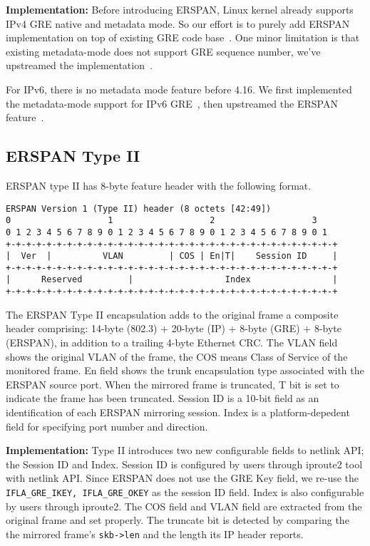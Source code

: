 \documentclass[10pt]{sigplanconf}
\begin{document}
\textbf{Implementation: }
Before introducing ERSPAN, Linux kernel already supports IPv4 GRE native
and metadata mode.  So our effort is to purely add ERSPAN implementation
on top of existing GRE code base~\cite{erspantype2}.
One minor limitation is that existing metadata-mode does not support
GRE sequence number, we've upstreamed the implementation~\cite{greseq}.

For IPv6, there is no metadata mode feature before 4.16.
We first implemented the metadata-mode support for IPv6 GRE~\cite{ip6md},
then upstreamed the ERSPAN feature~\cite{ip6erspanmd, ip6erspan}.


\subsection{ERSPAN Type II}
ERSPAN type II has 8-byte feature header with the following format.
{\scriptsize
\begin{verbatim}
ERSPAN Version 1 (Type II) header (8 octets [42:49])
0                   1                   2                   3
0 1 2 3 4 5 6 7 8 9 0 1 2 3 4 5 6 7 8 9 0 1 2 3 4 5 6 7 8 9 0 1
+-+-+-+-+-+-+-+-+-+-+-+-+-+-+-+-+-+-+-+-+-+-+-+-+-+-+-+-+-+-+-+-+
|  Ver  |          VLAN         | COS | En|T|    Session ID     |
+-+-+-+-+-+-+-+-+-+-+-+-+-+-+-+-+-+-+-+-+-+-+-+-+-+-+-+-+-+-+-+-+
|      Reserved         |                  Index                |
+-+-+-+-+-+-+-+-+-+-+-+-+-+-+-+-+-+-+-+-+-+-+-+-+-+-+-+-+-+-+-+-+
\end{verbatim}
}
The ERSPAN Type II encapsulation adds to the original
frame a composite header comprising: 14-byte (802.3) + 20-byte (IP)
+ 8-byte (GRE)  + 8-byte (ERSPAN), in addition to a trailing 4-byte
Ethernet CRC.
The VLAN field shows the original VLAN of the frame, the COS means
Class of Service of the monitored frame.
En field shows the trunk encapsulation type associated with the ERSPAN
source port.
When the mirrored frame is truncated, T bit is set to indicate the
frame has been truncated.
Session ID is a 10-bit field as an identification of each ERSPAN mirroring
session.
Index is a platform-depedent field for specifying port number and direction.

\textbf{Implementation: }
Type II introduces two new configurable fields to netlink API;
the Session ID and Index.
Session ID is configured by users through iproute2 tool with netlink API. 
Since ERSPAN does not use the GRE Key field, we re-use the
\texttt{IFLA\_GRE\_IKEY, IFLA\_GRE\_OKEY} as the session ID field.
Index is also configurable by users through iproute2.
The COS field and VLAN field are extracted from the original frame and set
properly.  The truncate bit is detected by comparing the the mirrored frame's
\texttt{skb->len} and the length its IP header reports.
\end{document}
